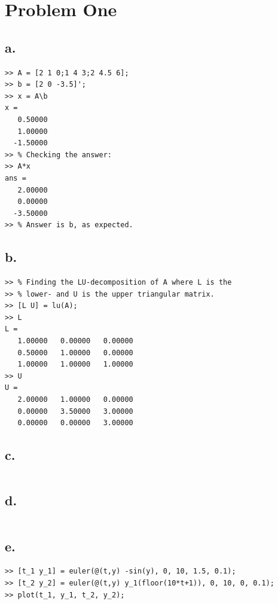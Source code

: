\documentclass[00-main.tex]{subfiles}
\begin{document}
\section*{Problem One}

\subsection*{a.}

\begin{verbatim}
>> A = [2 1 0;1 4 3;2 4.5 6];
>> b = [2 0 -3.5]';
>> x = A\b
x =
   0.50000
   1.00000
  -1.50000
>> % Checking the answer:
>> A*x
ans =
   2.00000
   0.00000
  -3.50000
>> % Answer is b, as expected.
\end{verbatim}

\subsection*{b.}

\begin{verbatim}
>> % Finding the LU-decomposition of A where L is the
>> % lower- and U is the upper triangular matrix.
>> [L U] = lu(A);
>> L
L =
   1.00000   0.00000   0.00000
   0.50000   1.00000   0.00000
   1.00000   1.00000   1.00000
>> U
U =
   2.00000   1.00000   0.00000
   0.00000   3.50000   3.00000
   0.00000   0.00000   3.00000
\end{verbatim}

\subsection*{c.}

\inputminted[linenos]{matlab}{newton_c.m}

\subsection*{d.}

\inputminted[linenos]{matlab}{newton_d.m}

\subsection*{e.}

\begin{verbatim}
>> [t_1 y_1] = euler(@(t,y) -sin(y), 0, 10, 1.5, 0.1);
>> [t_2 y_2] = euler(@(t,y) y_1(floor(10*t+1)), 0, 10, 0, 0.1);
>> plot(t_1, y_1, t_2, y_2);
\end{verbatim}
\end{document}
